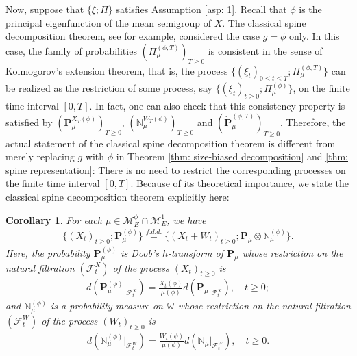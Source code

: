 \documentclass[12pt,a4paper]{amsart}
\newtheorem{cro}[thm]{Corollary}
\theoremstyle{definition}
\numberwithin{equation}{section}
\begin{document}
Now, suppose that $\{\xi; \Pi\}$ satisfies Assumption \ref{asp: 1}.
Recall that $\phi$ is the principal eigenfunction of the mean semigroup of $X$.
The classical spine decomposition theorem, see 
\cite{EckhoffKyprianouWinkel2015Spines, EnglanderKyprianou2004Local, LiuRenSong2009Llog} for example, 
considered the case $g = \phi$ only.
In this case, the family of probabilities $(\Pi_{\mu}^{(\phi,T)})_{T\geq 0}$ is consistent in the sense of Kolmogorov's extension theorem, that is, the process $\{(\xi_t)_{0\leq t\leq T}; \Pi_{\mu}^{(\phi,T)} \}$ can be realized as the restriction of some process, say $\{(\xi_t)_{t\geq 0}; \Pi_{\mu}^{(\phi)}\}$,	on the finite time interval $[0,T]$.
In fact, one can also check that this consistency property is satisfied by  $(\mathbf P_\mu^{X_T(\phi)} )_{T\geq 0}$, $(\mathbb N^{W_T(\phi)}_\mu)_{T\geq 0}$ and $(\dot {\mathbf P}^{(\phi,T)}_\mu)_{T\geq 0}$.
Therefore, the actual statement of the classical spine decomposition theorem is different from merely replacing $g$ with $\phi$ in Theorem \ref{thm: size-biased decomposition} and \ref{thm: spine representation}:
There is no need to restrict the corresponding processes on the finite time interval $[0,T]$.
Because of its theoretical importance, we state the classical spine decomposition theorem explicitly here:
	
\begin{cro}
	For each $\mu \in \mathcal M_E^\phi \cap \mathcal M_E^1$, we have
  \begin{align}
    \{(X_t)_{t\geq 0}; \mathbf P_\mu^{(\phi)}\}
    \overset{f.d.d.}{=} \{(X_t + W_t)_{t\geq 0}; \mathbf P_\mu \otimes \mathbb N^{(\phi)}_\mu\}.
  \end{align}
	Here, the probability $\mathbf P_\mu^{(\phi)}$ is Doob's $h$-transform of $\mathbf P_\mu$ whose restriction on the natural filtration $(\mathscr F_t^X)$ of the process $(X_t)_{t\geq 0}$ is
  \begin{align}
    d ( \mathbf P_\mu^{(\phi)}|_{\mathscr F_t^X})
    = \frac{X_t(\phi)}{ \mu(\phi)} d(\mathbf P_\mu|_{\mathscr F_t^X}),
    \quad t\geq 0;
  \end{align}
	and $\mathbb N_\mu^{(\phi)}$ is a probability measure on $\mathbb W$ whose restriction on the natural filtration $(\mathscr F_t^W)$ of the process $(W_t)_{t\geq 0}$ is
  \begin{align}
    d(\mathbb N_\mu^{(\phi)} |_{\mathscr F^W_t}  )
    = \frac{W_t(\phi)}{\mu(\phi)} d(\mathbb N_\mu |_{\mathscr F^W_t}  ),
    \quad t\geq 0.
  \end{align}
\end{cro}
\end{document}
